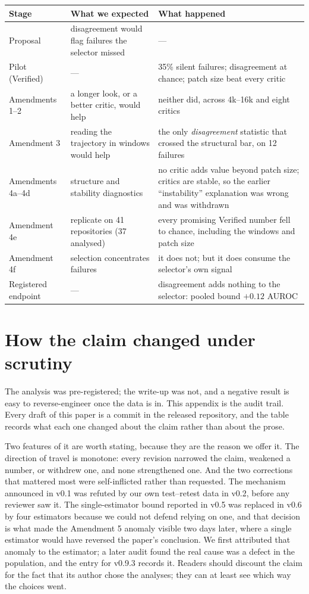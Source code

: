 \documentclass[11pt]{article}
\begin{document}
\bigskip
\begin{tabularx}{\linewidth}{@{}lXX@{}}\toprule
Stage & What we expected & What happened \\\midrule
Proposal & disagreement would flag failures the selector missed & --- \\
Pilot (Verified) & --- & 35\% silent failures; disagreement at chance; patch size beat every critic \\
Amendments 1--2 & a longer look, or a better critic, would help & neither did, across 4k--16k and eight critics \\
Amendment 3 & reading the trajectory in windows would help & the only \emph{disagreement} statistic that crossed the structural bar, on 12 failures \\
Amendments 4a--4d & structure and stability diagnostics & no critic adds value beyond patch size; critics are stable, so the earlier ``instability'' explanation was wrong and was withdrawn \\
Amendment 4e & replicate on 41 repositories (37 analysed) & every promising Verified number fell to chance, including the windows and patch size \\
Amendment 4f & selection concentrates failures & it does not; but it does consume the selector's own signal \\
Registered endpoint & --- & disagreement adds nothing to the selector: pooled bound $+0.12$ AUROC \\\bottomrule
\end{tabularx}
\normalsize

\section{How the claim changed under scrutiny}\label{sec:history}
\footnotesize
The analysis was pre-registered; the write-up was not, and a negative result is easy to reverse-engineer once the data is in. This appendix is the audit trail. Every draft of this paper is a commit in the released repository, and the table records what each one changed about the claim rather than about the prose.

Two features of it are worth stating, because they are the reason we offer it. The direction of travel is monotone: every revision narrowed the claim, weakened a number, or withdrew one, and none strengthened one. And the two corrections that mattered most were self-inflicted rather than requested. The mechanism announced in v0.1 was refuted by our own test--retest data in v0.2, before any reviewer saw it. The single-estimator bound reported in v0.5 was replaced in v0.6 by four estimators because we could not defend relying on one, and that decision is what made the Amendment 5 anomaly visible two days later, where a single estimator would have reversed the paper's conclusion. We first attributed that anomaly to the estimator; a later audit found the real cause was a defect in the population, and the entry for v0.9.3 records it. Readers should discount the claim for the fact that its author chose the analyses; they can at least see which way the choices went.
\end{document}

